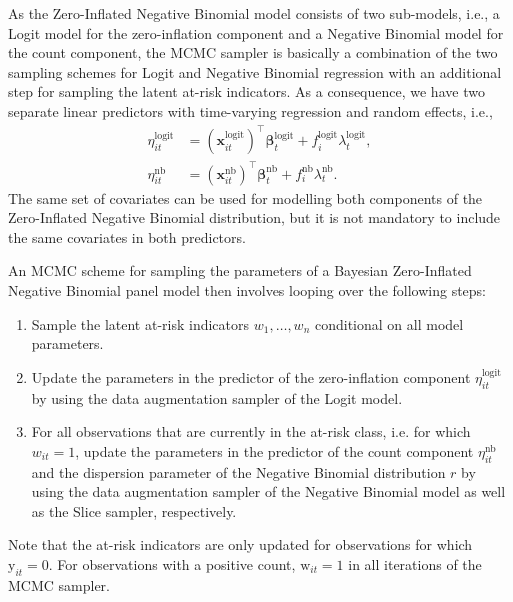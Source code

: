 \documentclass[a4paper, preprint, 3p,
authoryear]{elsarticle} %
\begin{document}
As the Zero-Inflated Negative Binomial model consists of two sub-models,
i.e., a Logit model for the zero-inflation component and a Negative
Binomial model for the count component, the MCMC sampler is basically a
combination of the two sampling schemes for Logit and Negative Binomial
regression with an additional step for sampling the latent at-risk
indicators. As a consequence, we have two separate linear predictors
with time-varying regression and random effects, i.e., \begin{equation*}
 \begin{aligned}
 \eta_{it}^{\text{logit}} &= (\textbf{x}^{\text{logit}}_{it})^\top \boldsymbol{\beta}_t^{\text{logit}} + f_i^{\text{logit}} \lambda_t^{\text{logit}}, \\
  \eta_{it}^{\text{nb}} &= (\textbf{x}^{\text{nb}}_{it})^\top \boldsymbol{\beta}_t^{\text{nb}} + f_i^{\text{nb}} \lambda_t^{\text{nb}}.
 \end{aligned}
\end{equation*} The same set of covariates can be used for modelling
both components of the Zero-Inflated Negative Binomial distribution, but
it is not mandatory to include the same covariates in both predictors.

An MCMC scheme for sampling the parameters of a Bayesian Zero-Inflated
Negative Binomial panel model then involves looping over the following
steps:

\begin{enumerate}
    \item Sample the latent at-risk indicators ${w}_1,\dots,{w}_n$ conditional on all model parameters.
    \item Update the parameters in the predictor of the zero-inflation component $\eta_{it}^{\text{logit}}$ by using the data augmentation sampler of the Logit model.
    \item For all observations that are currently in the at-risk class, i.e. for which $w_{it}=1$, update the parameters in the predictor of the count component $\eta_{it}^{\text{nb}}$ and the dispersion parameter of the Negative Binomial distribution $r$ by using the data augmentation sampler of the Negative Binomial model as well as the Slice sampler, respectively.
\end{enumerate}

Note that the at-risk indicators are only updated for observations for
which \(\text{y}_{it} = 0\). For observations with a positive count,
\(\text{w}_{it} = 1\) in all iterations of the MCMC sampler.
\end{document}
